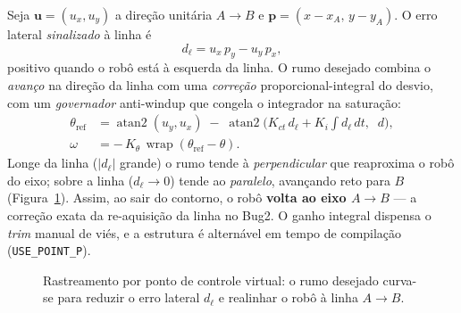 \documentclass[11pt,a4paper]{article}
\begin{document}
Seja $\mathbf{u}=(u_x,u_y)$ a direção unitária $A\!\to\!B$ e $\mathbf{p}=(x-x_A,\,y-y_A)$. O erro lateral \emph{sinalizado} à linha é
\begin{equation}
  d_\ell = u_x\,p_y - u_y\,p_x,
\end{equation}
positivo quando o robô está à esquerda da linha. O rumo desejado combina o \emph{avanço} na direção da linha com uma \emph{correção} proporcional-integral do desvio, com um \emph{governador} anti-windup que congela o integrador na saturação:
\begin{align}
  \theta_{\text{ref}} &= \operatorname{atan2}(u_y,u_x) \;-\; \operatorname{atan2}\!\Big(K_{ct}\,d_\ell + K_{i}\!\!\int\! d_\ell\,dt,\;\; d\Big), \\
  \omega &= -\,K_\theta\,\operatorname{wrap}(\theta_{\text{ref}}-\theta).
\end{align}
Longe da linha ($|d_\ell|$ grande) o rumo tende à \emph{perpendicular} que reaproxima o robô do eixo; sobre a linha ($d_\ell\!\to\!0$) tende ao \emph{paralelo}, avançando reto para $B$ (Figura~\ref{fig:pontoP}). Assim, ao sair do contorno, o robô \textbf{volta ao eixo $A\!\to\!B$} --- a correção exata da re-aquisição da linha no Bug2. O ganho integral dispensa o \emph{trim} manual de viés, e a estrutura é alternável em tempo de compilação (\texttt{USE\_POINT\_P}).

\begin{figure}[H]
\centering
{}
\caption{Rastreamento por ponto de controle virtual: o rumo desejado curva-se para reduzir o erro lateral $d_\ell$ e realinhar o robô à linha $A\!\to\!B$.}
\label{fig:pontoP}
\end{figure}
\end{document}
